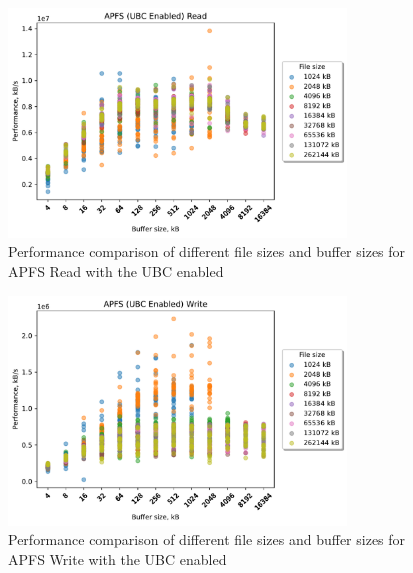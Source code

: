\begin{figure}[!htb]
	\label{fig:bench_apfs_ubc_scatter_read}
	\begin{center}
		\includegraphics[width=0.8\textwidth]{figures.nosync/benchmarking/APFS/scatter-UBC Enabled-Read.pdf}
	\end{center}
	\caption[Comparison of Read performance for file size and buffer size for APFS with the UBC enabled]{Performance comparison of different file sizes and buffer sizes for APFS Read with the UBC enabled}
\end{figure}
\begin{figure}[!htb]
	\label{fig:bench_apfs_ubc_scatter_write}
	\begin{center}
		\includegraphics[width=0.8\textwidth]{figures.nosync/benchmarking/APFS/scatter-UBC Enabled-Write.pdf}
	\end{center}
	\caption[Comparison of Write performance for file size and buffer size for APFS with the UBC enabled]{Performance comparison of different file sizes and buffer sizes for APFS Write with the UBC enabled}
\end{figure}
\clearpage
